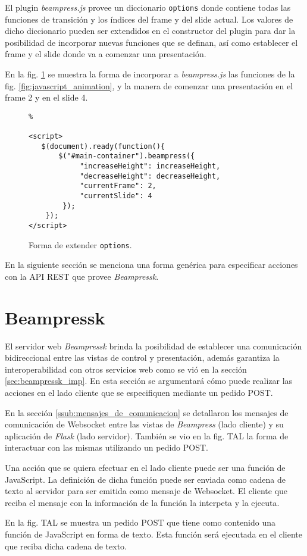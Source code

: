 		El plugin \textit{beampress.js} provee un diccionario \texttt{options} donde contiene todas las funciones de transición y los índices del frame y del slide actual. Los valores de dicho diccionario pueden ser extendidos en el constructor del plugin para dar la posibilidad de incorporar nuevas funciones que se definan, así como establecer el frame y el slide donde va a comenzar una presentación.

		En la fig. \ref{fig:extending_beampress} se muestra la forma de incorporar a \textit{beampress.js} las funciones de la fig. \ref{fig:javascript_animation}, y la manera de comenzar una presentación en el frame 2 y en el slide 4. 

		\begin{figure}[htb]%
			\begin{lstlisting}%

<script>
   $(document).ready(function(){ 
       $("#main-container").beampress({
       		"increaseHeight": increaseHeight,
       		"decreaseHeight": decreaseHeight,
       		"currentFrame": 2,
       		"currentSlide": 4
       	});
    });
</script>

			\end{lstlisting}
		\caption{Forma de extender \texttt{options}.} 
		\label{fig:extending_beampress}
		\end{figure}

		En la siguiente sección se menciona una forma genérica para especificar acciones con la API REST que provee \textit{Beampressk}. 

	\section{Beampressk} %
	\label{sec:beampressk_extended}
		El servidor web \textit{Beampressk} brinda la posibilidad de establecer una comunicación bidireccional entre las vistas de control y presentación, además garantiza la interoperabilidad con otros servicios web como se vió en la sección \ref{sec:beampressk_imp}. En esta sección se argumentará cómo puede realizar las acciones en el lado cliente que se especifiquen mediante un pedido POST.


		En la sección \ref{ssub:mensajes_de_comunicacion} se detallaron los mensajes de comunicación de Websocket entre las vistas de \textit{Beampress} (lado cliente) y su aplicación de \textit{Flask} (lado servidor). También se vio en la fig. TAL la forma de interactuar con las mismas utilizando un pedido POST. 

		Una acción que se quiera efectuar en el lado cliente puede ser una función de JavaScript. La definición de dicha función puede ser enviada como cadena de texto al servidor para ser emitida como mensaje de Websocket. El cliente que reciba el mensaje con la información de la función la interpeta y la ejecuta. 

		En la fig. TAL se muestra un pedido POST que tiene como contenido una función de JavaScript en forma de texto. Esta función será ejecutada en el cliente que reciba dicha cadena de texto. 

	
